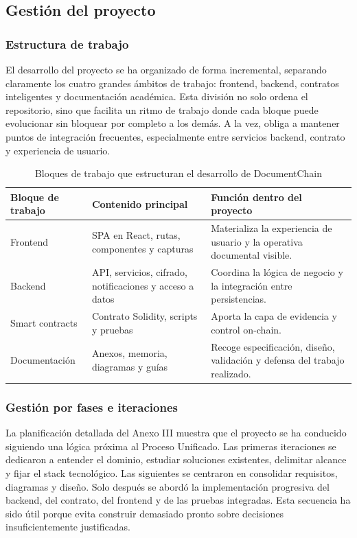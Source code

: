 \documentclass[11pt, a4paper]{article}
\begin{document}
\subsection{Gestión del proyecto}

\subsubsection{Estructura de trabajo}

El desarrollo del proyecto se ha organizado de forma incremental, separando claramente los cuatro grandes ámbitos de trabajo: frontend, backend, contratos inteligentes y documentación académica. Esta división no solo ordena el repositorio, sino que facilita un ritmo de trabajo donde cada bloque puede evolucionar sin bloquear por completo a los demás. A la vez, obliga a mantener puntos de integración frecuentes, especialmente entre servicios backend, contrato y experiencia de usuario.

\begin{table}[H]
    \centering
    \small
    \begin{tabular}{|p{3cm}|p{3.3cm}|p{6.3cm}|}
    \hline
    \textbf{Bloque de trabajo} & \textbf{Contenido principal} & \textbf{Función dentro del proyecto} \\
    \hline
    Frontend & SPA en React, rutas, componentes y capturas & Materializa la experiencia de usuario y la operativa documental visible. \\
    \hline
    Backend & API, servicios, cifrado, notificaciones y acceso a datos & Coordina la lógica de negocio y la integración entre persistencias. \\
    \hline
    Smart contracts & Contrato Solidity, scripts y pruebas & Aporta la capa de evidencia y control on-chain. \\
    \hline
    Documentación & Anexos, memoria, diagramas y guías & Recoge especificación, diseño, validación y defensa del trabajo realizado. \\
    \hline
    \end{tabular}
    \caption{Bloques de trabajo que estructuran el desarrollo de DocumentChain}
    \label{tab:bloques-trabajo}
\end{table}

\subsubsection{Gestión por fases e iteraciones}

La planificación detallada del Anexo III muestra que el proyecto se ha conducido siguiendo una lógica próxima al Proceso Unificado. Las primeras iteraciones se dedicaron a entender el dominio, estudiar soluciones existentes, delimitar alcance y fijar el stack tecnológico. Las siguientes se centraron en consolidar requisitos, diagramas y diseño. Solo después se abordó la implementación progresiva del backend, del contrato, del frontend y de las pruebas integradas. Esta secuencia ha sido útil porque evita construir demasiado pronto sobre decisiones insuficientemente justificadas.
\end{document}
